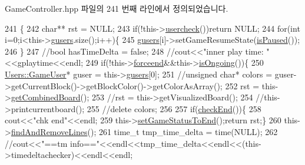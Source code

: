 Game\+Controller.\+hpp 파일의 241 번째 라인에서 정의되었습니다.


\begin{DoxyCode}
241                               \{
242             \textcolor{keywordtype}{char}** rst = NULL;
243             \textcolor{keywordflow}{if}(!this->\hyperlink{class_tetris_1_1_game_controller_ab96e22daad51119b35cbee8cfb7385ef}{usercheck}())\textcolor{keywordflow}{return} NULL;
244             \textcolor{keywordflow}{for}(\textcolor{keywordtype}{int} i=0;i<this->\hyperlink{class_tetris_1_1_game_controller_a1a31d3a933daad6d95e20458eea2900e}{gusers}.size();i++)\{
245                 \hyperlink{class_tetris_1_1_game_controller_a1a31d3a933daad6d95e20458eea2900e}{gusers}[i]->setGameResumeState(\hyperlink{class_tetris_1_1_game_controller_a18e513f45750361e14af091704e9f1d4}{isPaused}());
246             \}
247             \textcolor{comment}{//bool hasTimeDelta = false;}
248             \textcolor{comment}{//cout<<"inner play time: "<<gplaytime<<endl;}
249             \textcolor{keywordflow}{if}(!this->\hyperlink{class_tetris_1_1_game_controller_a015411333b232483387d89f3ba0617e0}{forceend}&&this->\hyperlink{class_tetris_1_1_game_controller_aecd04e471f7819a8b3f80e0dda748bdc}{isOngoing}())\{
250                 \hyperlink{class_tetris_1_1_users_1_1_game_user}{Users::GameUser}* guser = this->\hyperlink{class_tetris_1_1_game_controller_a1a31d3a933daad6d95e20458eea2900e}{gusers}[0];
251                 \textcolor{comment}{//unsigned char* colors = guser->getCurrentBlock()->getBlockColor()->getColorAsArray();}
252                 rst = this->\hyperlink{class_tetris_1_1_game_controller_a6c22f25017881f6150428b62e4607310}{getCombinedBoard}();
253                 \textcolor{comment}{//rst = this->getVisualizedBoard();}
254                 \textcolor{comment}{//this->printcurrentboard();}
255                 \textcolor{comment}{//delete colors;}
256                 
257                 \textcolor{keywordflow}{if}(\hyperlink{class_tetris_1_1_game_controller_ac8058c827eaa393194dcfb83c6964f8a}{checkEnd}())\{
258                     cout<<\textcolor{stringliteral}{"chk end"}<<endl;
259                     this->\hyperlink{class_tetris_1_1_game_controller_a3c5e6034b2e2faf70371a13eb5f9c5bb}{setGameStatusToEnd}();\textcolor{keywordflow}{return} rst;\}
260                 this->\hyperlink{class_tetris_1_1_game_controller_ab19e8563acc9e724e130de60f87600b7}{findAndRemoveLines}();
261                 time\_t tmp\_time\_delta = time(NULL);
262                 \textcolor{comment}{//cout<<"==tm info=="<<endl<<tmp\_time\_delta<<endl<<(this->timedeltachecker)<<endl<<endl;}

\end{DoxyCode}
